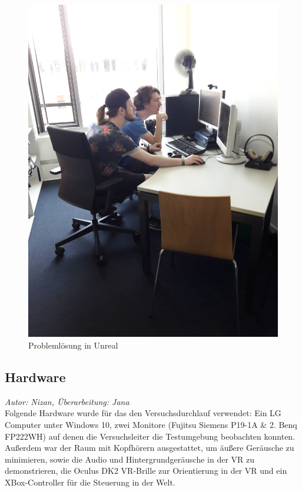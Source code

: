 \documentclass{Bericht}
\begin{document}
		

		\begin{figure}[!htbp] %
			\centering
			\includegraphics[trim = 200mm 0mm 600mm 0mm, clip, height=\linewidth, width=\textheight, keepaspectratio, angle=270]{../Bilder/20170619_102101.jpg} %
			\caption{Problemlösung in Unreal}
			\label{img:porblemloesung}
		\end{figure}
		
\subsection{Hardware}
\label{subsec:hardware}
\textit{Autor: Nizan, Überarbeitung: Jana}\\
Folgende Hardware wurde für das den Versuchsdurchlauf verwendet: Ein LG Computer unter Windows 10, zwei Monitore (Fujitsu Siemens P19-1A \& 2. Benq FP222WH) auf denen die Versuchsleiter die Testumgebung beobachten konnten. Außerdem war der Raum mit Kopfhörern ausgestattet, um äußere Geräusche zu minimieren, sowie die Audio und Hintergrundgeräusche in der VR zu demonstrieren, die Oculus DK2 VR-Brille zur Orientierung in der VR und ein XBox-Controller für die Steuerung in der Welt.
\end{document}
